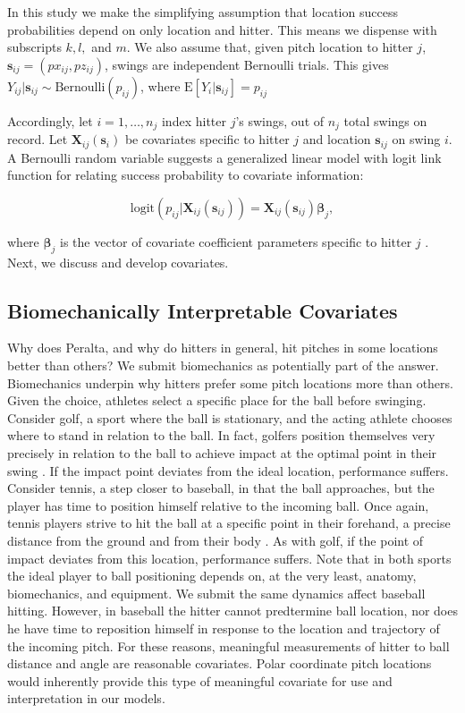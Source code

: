 \documentclass{article}
\begin{document}
In this study we make the simplifying assumption that location success probabilities depend on only location and hitter. This means we dispense with subscripts $k, l,$ and $m$. We also assume that, given pitch location to hitter $j$, $\pmb{s}_{ij} = (px_{ij}, pz_{ij})$,  swings are independent Bernoulli trials. This gives $Y_{ij}|\pmb{s}_{ij} \sim \text{Bernoulli}(p_{ij})$, where $\text{E}[Y_{i}|\pmb{s}_{ij}] = p_{ij}$

Accordingly, let $i = 1, \dots, n_{j}$ index hitter $j$'s swings, out of $n_{j}$ total swings on record. Let $\pmb{X}_{ij}(\pmb{s}_{i})$ be covariates specific to hitter $j$ and location $\pmb{s}_{ij}$ on swing $i$. A Bernoulli random variable suggests a generalized linear model with logit link function for relating success probability to covariate information: 

\begin{equation}
\text{logit}(p_{ij}|\pmb{X}_{ij}(\pmb{s}_{ij})) = \pmb{X}_{ij}(\pmb{s}_{ij}) \pmb{\beta}_{j},
\end{equation}

where $\pmb{\beta}_{j}$ is the vector of covariate coefficient parameters specific to hitter $j$ \citep{Myers2012}. Next, we discuss and develop covariates.

\subsection{Biomechanically Interpretable Covariates} %

Why does Peralta, and why do hitters in general, hit pitches in some locations better than others? We submit biomechanics as potentially part of the answer. Biomechanics underpin why hitters prefer some pitch locations more than others. Given the choice, athletes select a specific place for the ball before swinging. Consider golf, a sport where the ball is stationary, and the acting athlete chooses where to stand in relation to the ball. In fact, golfers position themselves very precisely in relation to the ball to achieve impact at the optimal point in their swing \citep{Cochran2005}. If the impact point deviates from the ideal location, performance suffers. Consider tennis, a step closer to baseball, in that the ball approaches, but the player has time to position himself relative to the incoming ball. Once again, tennis players strive to hit the ball at a specific point in their forehand, a precise distance from the ground and from their body \citep{Elliott2006}. As with golf, if the point of impact deviates from this location, performance suffers. Note that in both sports the ideal player to ball positioning depends on, at the very least, anatomy, biomechanics, and equipment. We submit the same dynamics affect baseball hitting. However, in baseball the hitter cannot predtermine ball location, nor does he have time to reposition himself in response to the location and trajectory of the incoming pitch. For these reasons, meaningful measurements of hitter to ball distance and angle are reasonable covariates. Polar coordinate pitch locations would inherently provide this type of meaningful covariate for use and interpretation in our models. 
\end{document}
